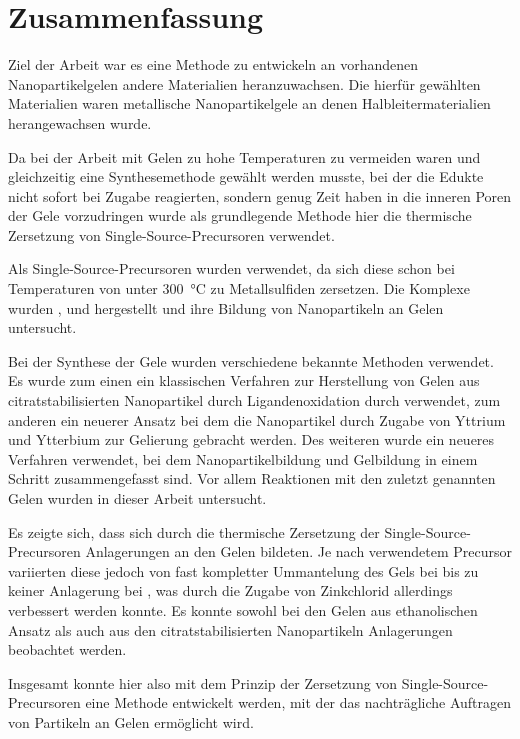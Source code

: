 \section{Zusammenfassung}

Ziel der Arbeit war es eine Methode zu entwickeln an vorhandenen Nanopartikelgelen andere Materialien heranzuwachsen.
Die hierfür gewählten Materialien waren metallische Nanopartikelgele an denen Halbleitermaterialien herangewachsen wurde.

Da bei der Arbeit mit Gelen zu hohe Temperaturen zu vermeiden waren und gleichzeitig eine Synthesemethode gewählt werden musste, bei der die Edukte nicht sofort bei Zugabe reagierten, sondern genug Zeit haben in die inneren Poren der Gele vorzudringen wurde als grundlegende Methode hier die thermische Zersetzung von Single-Source-Precursoren verwendet.

Als Single-Source-Precursoren wurden   verwendet, da sich diese schon bei Temperaturen von unter \SI{300}{\degreeCelsius} zu Metallsulfiden zersetzen.
Die Komplexe wurden ,  und  hergestellt und ihre Bildung von Nanopartikeln an Gelen untersucht.

Bei der Synthese der Gele wurden verschiedene bekannte Methoden verwendet.
Es wurde zum einen ein klassischen Verfahren zur Herstellung von Gelen aus citratstabilisierten Nanopartikel durch Ligandenoxidation durch  verwendet,
zum anderen ein neuerer Ansatz bei dem die Nanopartikel durch Zugabe von Yttrium und Ytterbium zur Gelierung gebracht werden.
Des weiteren wurde ein neueres Verfahren verwendet, bei dem Nanopartikelbildung und Gelbildung in einem Schritt zusammengefasst sind.
Vor allem Reaktionen mit den zuletzt genannten Gelen wurden in dieser Arbeit untersucht.

Es zeigte sich, dass sich durch die thermische Zersetzung der Single-Source-Precursoren Anlagerungen an den Gelen bildeten.
Je nach verwendetem Precursor variierten diese jedoch von fast kompletter Ummantelung des Gels bei  bis zu keiner Anlagerung bei , was durch die Zugabe von Zinkchlorid allerdings verbessert werden konnte.
Es konnte sowohl bei den Gelen aus ethanolischen Ansatz als auch aus den citratstabilisierten Nanopartikeln Anlagerungen beobachtet werden.

Insgesamt konnte hier also mit dem Prinzip der Zersetzung von Single-Source-Precursoren eine Methode entwickelt werden, mit der das nachträgliche Auftragen von Partikeln an Gelen ermöglicht wird.

